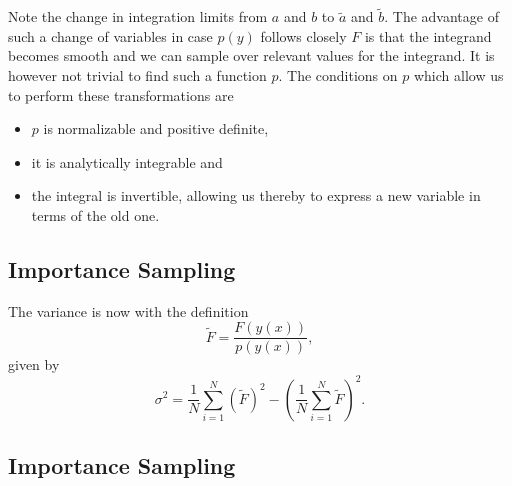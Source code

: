 \documentclass[%
oneside,                 %
final,                   %
10pt]{article}
\newenvironment{block_mdfboxadmon}[1][]{
\begin{block_mdfboxmdframed}[frametitle=#1]
}
{
\end{block_mdfboxmdframed}
}
\begin{document}
\begin{block_mdfboxadmon}[]
Note the change in integration limits from $a$ and $b$ to $\tilde{a}$ and 
$\tilde{b}$.
The advantage of such a change of variables in case $p(y)$ follows
closely $F$ is that the integrand becomes smooth and we can sample
over relevant values for the integrand. It is however not trivial
to find such a function $p$.
The conditions on $p$ which allow us to perform these transformations
are

\begin{itemize}
  \item $p$ is normalizable and positive definite,

  \item it is analytically integrable and

  \item the integral is invertible, allowing us thereby to express a new variable in terms of the old one.
\end{itemize}

\noindent
\end{block_mdfboxadmon} %



\subsection{Importance Sampling}

\begin{block_mdfboxadmon}[]
The variance  is now with the definition
\begin{equation*}
 \tilde{F}=\frac{F(y(x))}{p(y(x))},
\end{equation*}
given by
\begin{equation*}
  \sigma^2=\frac{1}{N}\sum_{i=1}^N\left(\tilde{F}\right)^2-
\left(\frac{1}{N}\sum_{i=1}^N\tilde{F}\right)^2.
\label{eq:standard_is}
\end{equation*}
\end{block_mdfboxadmon} %



\subsection{Importance Sampling}
\end{document}
